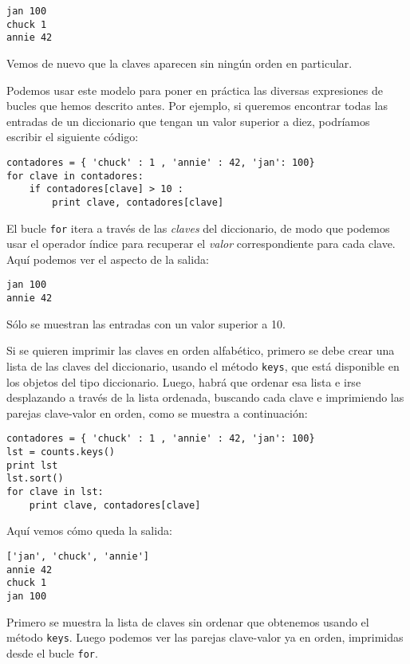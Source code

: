 \beforeverb
\begin{verbatim}
jan 100
chuck 1
annie 42
\end{verbatim}
\afterverb
%
Vemos de nuevo que la claves aparecen sin ningún orden en particular.

Podemos usar este modelo para poner en práctica las diversas expresiones de bucles
que hemos descrito antes. Por ejemplo, si queremos
encontrar todas las entradas de un diccionario que tengan un valor
superior a diez, podríamos escribir el siguiente código:

\beforeverb
\begin{verbatim}
contadores = { 'chuck' : 1 , 'annie' : 42, 'jan': 100}
for clave in contadores:
    if contadores[clave] > 10 :
        print clave, contadores[clave]
\end{verbatim}
\afterverb
%
El bucle {\tt for} itera a través de las
{\em claves} del diccionario, de modo que podemos
usar el operador índice para recuperar el
{\em valor} correspondiente
para cada clave.
Aquí podemos ver el aspecto de la salida:

\beforeverb
\begin{verbatim}
jan 100
annie 42
\end{verbatim}
\afterverb
%
Sólo se muestran las entradas con un valor superior a 10.

Si se quieren imprimir las claves en orden alfabético, primero
se debe crear una lista de las claves del diccionario, usando el
método {\tt keys}, que está disponible en los objetos del tipo diccionario.
Luego, habrá que ordenar esa lista
e irse desplazando a través de la lista ordenada, buscando cada
clave e imprimiendo las parejas clave-valor en orden,
como se muestra a continuación:

\beforeverb
\begin{verbatim}
contadores = { 'chuck' : 1 , 'annie' : 42, 'jan': 100}
lst = counts.keys()
print lst
lst.sort()
for clave in lst:
    print clave, contadores[clave]
\end{verbatim}
\afterverb
%
Aquí vemos cómo queda la salida:

\beforeverb
\begin{verbatim}
['jan', 'chuck', 'annie']
annie 42
chuck 1
jan 100
\end{verbatim}
\afterverb
%
Primero se muestra la lista de claves sin ordenar que
obtenemos usando el método {\tt keys}. Luego podemos ver las
parejas clave-valor ya en orden, imprimidas desde el bucle {\tt for}.

